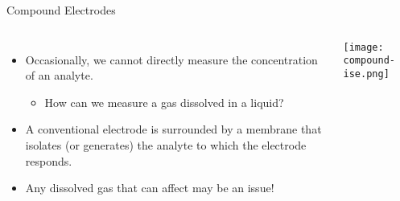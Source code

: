 \documentclass[notes=show]{beamer}
\begin{document}

%
%

\begin{frame}{Compound Electrodes}
	\begin{columns}
		\begin{itemize}
			\item Occasionally, we cannot directly measure the
				concentration of an analyte.
				\begin{itemize}
					\item How can we measure a gas dissolved
						in a liquid?
				\end{itemize}
			\item  A conventional electrode is surrounded by a
				membrane that isolates (or generates) the
				analyte to which the electrode responds.
			\item Any dissolved gas that can affect \pH{} may be an
				issue!
		\end{itemize}
		\begin{center}
			\texttt{[image: compound-ise.png]}
		\end{center}
	\end{columns}
\end{frame}

\end{document}
